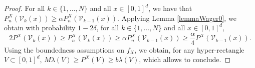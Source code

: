 \documentclass[10pt,a4paper]{amsart}
\begin{document}
\begin{proof}
For all $k\in \{1,\ldots, N\}$ and all $x\in [0,1]^d$, we have that $P_n^X(\mathcal V_k(x)) \geq \alpha P_n^X(\mathcal{V}_{k-1}(x))$. 
Applying Lemma \ref{lemmaWager0}, we obtain with probability $1-2\delta $, 
for all $k\in \{1,\ldots, N\}$ and all $x\in [0,1]^d$,
$$ 2 P^X(\mathcal V_k(x)) \geq P_n^X(\mathcal V_k(x)) \geq \alpha P_n^X(\mathcal{V}_{k-1}(x)) \geq \frac{\alpha }{4} P^X(\mathcal V_{k-1}(x)).$$
Using the boundedness assumptions on $f_X$, we obtain, for any hyper-rectangle $V\subset [0,1]^d$, $M \lambda(V) \geq  P^X(V ) \geq b \lambda(V)$, which allows to conclude.

\end{proof}
\end{document}
